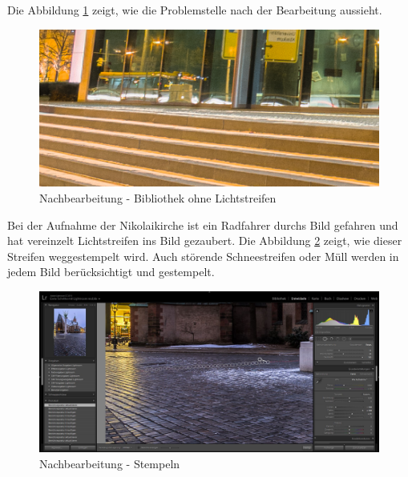 \documentclass[liststotoc,bibtotoc,fontsize=14pt,]{scrreprt}
\begin{document}
		Die Abbildung \ref{img:bibo_reworked} zeigt, wie die Problemstelle nach der Bearbeitung aussieht.
		\bigskip
		\begin{figure}[H]
			\includegraphics[width=\linewidth]{img/bibo_bearbeitet.PNG}
			\caption{Nachbearbeitung - Bibliothek ohne Lichtstreifen}
			\label{img:bibo_reworked}
		\end{figure}
		
		Bei der Aufnahme der Nikolaikirche ist ein Radfahrer durchs Bild gefahren und hat vereinzelt Lichtstreifen ins Bild gezaubert. Die Abbildung \ref{img:stamp} zeigt, wie dieser Streifen weggestempelt wird. Auch störende Schneestreifen oder Müll werden in jedem Bild berücksichtigt und gestempelt.
		
		\bigskip
		\begin{figure}[H]
			\includegraphics[width=\linewidth]{img/hdr_stempeln.JPG}
			\caption{Nachbearbeitung - Stempeln}
			\label{img:stamp}
		\end{figure}
	
\end{document}
